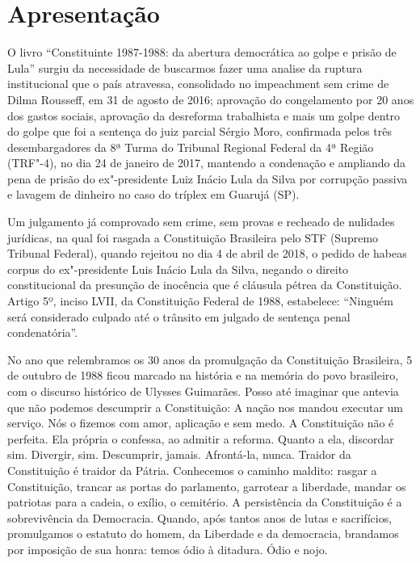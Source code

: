 \chapter{Apresentação}%

O livro “Constituinte 1987-1988: da abertura democrática ao golpe e prisão de Lula” surgiu da necessidade de buscarmos fazer uma analise da ruptura institucional que o país atravessa, consolidado no impeachment sem crime de Dilma Rousseff, em 31 de agosto de 2016; aprovação do congelamento por 20 anos dos gastos sociais, aprovação da desreforma trabalhista e mais um golpe dentro do golpe que foi a sentença do juiz parcial Sérgio Moro, confirmada pelos três desembargadores da 8ª Turma do Tribunal Regional Federal da 4ª Região (TRF"-4), no dia 24 de janeiro de 2017, mantendo a condenação e ampliando da pena de prisão do ex"-presidente Luiz Inácio Lula da Silva por corrupção passiva e lavagem de dinheiro no caso do tríplex em Guarujá (SP).

Um julgamento já comprovado sem crime, sem provas e recheado de nulidades jurídicas, na qual foi rasgada a Constituição Brasileira pelo STF (Supremo Tribunal Federal), quando rejeitou no dia 4 de abril de 2018, o pedido de habeas corpus do ex"-presidente Luis Inácio Lula da Silva, negando o direito constitucional da presunção de inocência que é cláusula pétrea da Constituição. Artigo 5º, inciso LVII, da Constituição Federal de 1988, estabelece: “Ninguém será considerado culpado até o trânsito em julgado de sentença penal condenatória”.

No ano que relembramos os 30 anos da promulgação da Constituição Brasileira, 5 de outubro de 1988 ficou marcado na história e na memória do povo brasileiro, com o discurso histórico de Ulysses Guimarães. Posso até imaginar que antevia que não podemos descumprir a Constituição: A nação nos mandou executar um serviço. Nós o fizemos com amor, aplicação e sem medo. A Constituição não é perfeita. Ela própria o confessa, ao admitir a reforma. Quanto a ela, discordar sim. Divergir, sim. Descumprir, jamais. Afrontá-la, nunca. Traidor da Constituição é traidor da Pátria. Conhecemos o caminho maldito: rasgar a Constituição, trancar as portas do parlamento, garrotear a liberdade, mandar os patriotas para a cadeia, o exílio, o cemitério. A persistência da Constituição é a sobrevivência da Democracia. Quando, após tantos anos de lutas e sacrifícios, promulgamos o estatuto do homem, da Liberdade e da democracia, brandamos por imposição de sua honra: temos ódio à ditadura. Ódio e nojo.

